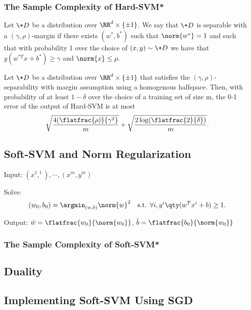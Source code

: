 \subsubsection{The Sample Complexity of Hard-SVM*}
\begin{defi}[Separability]
	Let $\+D$ be a distribution over $\RR^d \times \{\pm1\}$.
	We say that $\+D$ is separable with a $(\gamma,\rho)$-margin if there exists $(w^*,b^*)$ such that $\norm{w^*} = 1$ and such that with probability 1 over the choice of $(x, y) \sim \+D$ we have that $y(w^{*T}x+ b^*)\ge \gamma$ and $\norm{x}\le  \rho$. 
\end{defi}
\begin{thm}
	Let $\+D$ be a distribution over $\RR^d\times\{\pm1\}$ that satisfies the $(\gamma,\rho)$-separability with margin assumption using a homogenous halfspace.
	Then, with probability of at least $1 - \delta$ over the choice of a training set of size m, the 0-1 error of the output of Hard-SVM is at most
	\[
		\sqrt{\frac{4(\flatfrac{\rho)}{\gamma^2}}{m}}+\sqrt{\frac{2\log(\flatfrac{2}{\delta})}{m}}
	.\] 
	
\end{thm}
\subsection{Soft-SVM and Norm Regularization}
\begin{md}
	Input: $(x^1,^1),\cdots,(x^m,y^m)$

	Solve:
	\[
		(w_0,b_0)=\argmin_{(w,b)}\norm{w}^2
		\ \ \ 
		\text{s.t. }\forall i, y^i\qty(w^Tx^i+b)\ge 1
	.\]

	Output: $\hat{w}=\flatfrac{w_0}{\norm{w_0}}$, $\hat{b}=\flatfrac{b_0}{\norm{w_0}}$
\end{md}
\subsubsection{The Sample Complexity of Soft-SVM*}
\subsection{Duality}
\subsection{Implementing Soft-SVM Using SGD}


